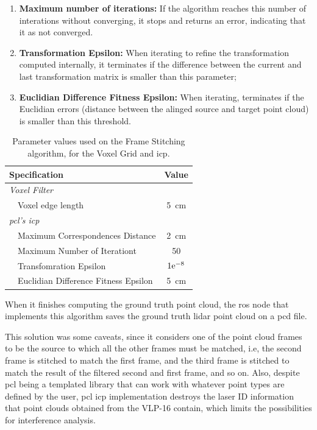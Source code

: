 \begin{enumerate}
	\item \textbf{Maximum number of iterations:} If the algorithm reaches this number of interations without converging, it stops and returns an error, indicating that it as not converged.
	\item \textbf{Transformation Epsilon:} When iterating to refine the transformation computed internally, it terminates if the difference between the current and last transformation matrix is smaller than this parameter;
	\item \textbf{Euclidian Difference Fitness Epsilon:} When iterating, terminates if the Euclidian errors (distance between the alinged source and target point cloud) is smaller than this threshold.
\end{enumerate}


\begin{table}[H]
	\centering
	\renewcommand{\arraystretch}{1.2}
	\begin{tabular}{@{}lp{8cm}c@{}}
		\toprule
		\multicolumn{2}{l}{Specification} & Value \\
			\midrule
		\multicolumn{2}{l}{\textit{Voxel Filter}} & \\ 
		\phantom{ab} & Voxel edge length & \SI{5}{\centi\meter} \\ 
		\midrule
		\multicolumn{2}{l}{\textit{\ac{pcl}'s \ac{icp}}} &  \\ 
		\phantom{ab} & Maximum Correspondences Distance & \SI{2}{\centi\meter} \\
								 & Maximum Number of Iterationt & 50 \\
								 & Transfomration Epsilon & $1\mathrm{e}^{-8}$ \\
								 & Euclidian Difference Fitness Epsilon & \SI{5}{\centi\meter} \\
		\bottomrule
	\end{tabular}
	\caption{Parameter values used on the Frame Stitching algorithm, for the Voxel Grid and \ac{icp}.}
	\label{tab:frame-stitching-parameters}
\end{table}

When it finishes computing the ground truth point cloud, the \ac{ros} node that implements this algorithm saves the ground truth \ac{lidar} point cloud on a \ac{pcd} file.

This solution was some caveats, since it considers one of the point cloud frames to be the source to which all the other frames must be matched, i.e, the second frame is stitched to match the first frame, and the third frame is stitched to match the result of the filtered second and first frame, and so on. Also, despite \ac{pcl} being a templated library that can work with whatever point types are defined by the user, \ac{pcl} \ac{icp} implementation destroys the laser ID information that point clouds obtained from the VLP-16 contain, which limits the possibilities for interference analysis. 


